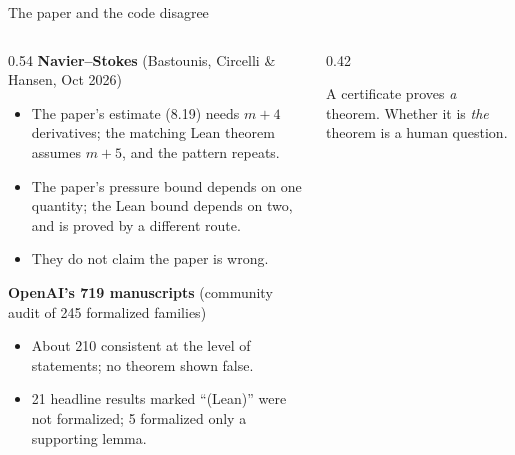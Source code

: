 \begin{frame}{The paper and the code disagree}
  \small\sffamily
  \begin{columns}[T]
    \begin{column}{0.54\textwidth}
      \textbf{Navier--Stokes} (Bastounis, Circelli \& Hansen, Oct 2026)
      \begin{itemize}\footnotesize
        \item The paper's estimate (8.19) needs $m{+}4$ derivatives; the matching Lean theorem assumes $m{+}5$, and the pattern repeats.
        \item The paper's pressure bound depends on one quantity; the Lean bound depends on two, and is proved by a different route.
        \item They do not claim the paper is wrong.
      \end{itemize}
      \medskip
      \textbf{OpenAI's 719 manuscripts} (community audit of 245 formalized families)
      \begin{itemize}\footnotesize
        \item About 210 consistent at the level of statements; no theorem shown false.
        \item 21 headline results marked ``(Lean)'' were not formalized; 5 formalized only a supporting lemma.
      \end{itemize}
    \end{column}
    \begin{column}{0.42\textwidth}
      \vspace{0.4cm}
      \vspace{0.5cm}

      {\footnotesize A certificate proves \emph{a} theorem. Whether it is \emph{the} theorem is a human question.}
    \end{column}
  \end{columns}
\end{frame}

